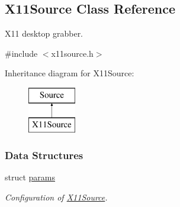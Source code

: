 \hypertarget{classX11Source}{\subsection{\-X11\-Source \-Class \-Reference}
\label{classX11Source}
}


\-X11 desktop grabber.  




{\ttfamily \#include $<$x11source.\-h$>$}

\-Inheritance diagram for \-X11\-Source\-:\begin{figure}[H]
\begin{center}
\leavevmode
\includegraphics[height=2.000000cm]{classX11Source}
\end{center}
\end{figure}
\subsubsection*{\-Data \-Structures}
\begin{DoxyCompactItemize}
\item 
struct \hyperlink{structX11Source_1_1params}{params}
\begin{DoxyCompactList}\small\item\em \-Configuration of \hyperlink{classX11Source}{\-X11\-Source}. \end{DoxyCompactList}\end{DoxyCompactItemize}
